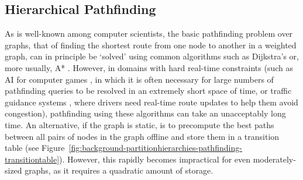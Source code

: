 \subsection{Hierarchical Pathfinding}

As is well-known among computer scientists, the basic pathfinding problem over graphs, that of finding the shortest route from one node to another in a weighted graph, can in principle be `solved' using common algorithms such as Dijkstra's or, more usually, A* \cite{aima}. However, in domains with hard real-time constraints (such as AI for computer games \cite{dickheiser04,vandersterren04}, in which it is often necessary for large numbers of pathfinding queries to be resolved in an extremely short space of time, or traffic guidance systems \cite{jing96,jung96,kim98}, where drivers need real-time route updates to help them avoid congestion), pathfinding using these algorithms can take an unacceptably long time. An alternative, if the graph is static, is to precompute the best paths between all pairs of nodes in the graph offline and store them in a transition table (see Figure~\ref{fig:background-partitionhierarchies-pathfinding-transitiontable}). However, this rapidly becomes impractical for even moderately-sized graphs, as it requires a quadratic amount of storage.

